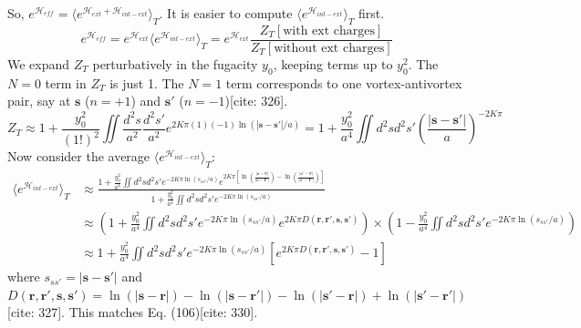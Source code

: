\documentclass[11pt]{article}
\begin{document}
So, $e^{\mathcal{H}_{eff}} = \langle e^{\mathcal{H}_{ext} + \mathcal{H}_{int-ext}} \rangle_T$. It is easier to compute $\langle e^{\mathcal{H}_{int-ext}} \rangle_T$ first.
\begin{equation}
e^{\mathcal{H}_{eff}} = e^{\mathcal{H}_{ext}} \langle e^{\mathcal{H}_{int-ext}} \rangle_T = e^{\mathcal{H}_{ext}} \frac{Z_T[\text{with ext charges}]}{Z_T[\text{without ext charges}]}
\end{equation}
We expand $Z_T$ perturbatively in the fugacity $y_0$, keeping terms up to $y_0^2$. The $N=0$ term in $Z_T$ is just 1. The $N=1$ term corresponds to one vortex-antivortex pair, say at $\mathbf{s}$ ($n=+1$) and $\mathbf{s}'$ ($n=-1$)[cite: 326].
\begin{equation}
Z_T \approx 1 + \frac{y_0^2}{(1!)^2} \iint \frac{d^2s}{a^2} \frac{d^2s'}{a^2} e^{2K\pi (1)(-1) \ln(|\mathbf{s}-\mathbf{s}'|/a)} = 1 + \frac{y_0^2}{a^4} \iint d^2s d^2s' \left(\frac{|\mathbf{s}-\mathbf{s}'|}{a}\right)^{-2K\pi} \label{eq:app_Zt_expand}
\end{equation}
Now consider the average $\langle e^{\mathcal{H}_{int-ext}} \rangle_T$:
\begin{align}
\langle e^{\mathcal{H}_{int-ext}} \rangle_T &\approx \frac{1 + \frac{y_0^2}{a^4} \iint d^2s d^2s' e^{-2K\pi \ln(s_{ss'}/a)} e^{2K\pi [\ln(\frac{|\mathbf{s}-\mathbf{r}|}{|\mathbf{s}-\mathbf{r}'|}) - \ln(\frac{|\mathbf{s}'-\mathbf{r}|}{|\mathbf{s}'-\mathbf{r}'|})]}}{1 + \frac{y_0^2}{a^4} \iint d^2s d^2s' e^{-2K\pi \ln(s_{ss'}/a)}} \\
&\approx \left( 1 + \frac{y_0^2}{a^4} \iint d^2s d^2s' e^{-2K\pi \ln(s_{ss'}/a)} e^{2K\pi D(\mathbf{r},\mathbf{r}',\mathbf{s},\mathbf{s}')} \right) \times \left( 1 - \frac{y_0^2}{a^4} \iint d^2s d^2s' e^{-2K\pi \ln(s_{ss'}/a)} \right) \\
&\approx 1 + \frac{y_0^2}{a^4} \iint d^2s d^2s' e^{-2K\pi \ln(s_{ss'}/a)} [e^{2K\pi D(\mathbf{r},\mathbf{r}',\mathbf{s},\mathbf{s}')} - 1] \label{eq:app_avg_result}
\end{align}
where $s_{ss'} = |\mathbf{s}-\mathbf{s}'|$ and $D(\mathbf{r},\mathbf{r}',\mathbf{s},\mathbf{s}') = \ln(|\mathbf{s}-\mathbf{r}|) - \ln(|\mathbf{s}-\mathbf{r}'|) - \ln(|\mathbf{s}'-\mathbf{r}|) + \ln(|\mathbf{s}'-\mathbf{r}'|)$[cite: 327]. This matches Eq. (106)[cite: 330].
\end{document}

